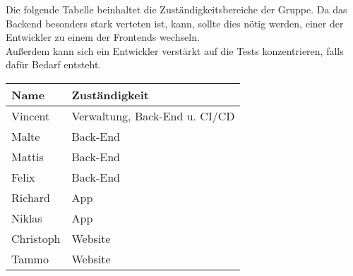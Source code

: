 Die folgende Tabelle beinhaltet die Zuständigkeitsbereiche der Gruppe.
Da das Backend besonders stark verteten ist, kann, sollte dies nötig werden, einer der Entwickler zu einem der Frontends wechseln. \\
Außerdem kann sich ein Entwickler verstärkt auf die Tests konzentrieren, falls dafür Bedarf entsteht. \\

\begin{tabular}{ll}
 \rowcolor[HTML]{E7E7E7} 
 \textbf{Name} & \textbf{Zuständigkeit} \\ \hline
 Vincent & Verwaltung, Back-End u. CI/CD \\ 
 \rowcolor[HTML]{E7E7E7} 
 Malte & Back-End \\ 
 Mattis & Back-End \\ 
 \rowcolor[HTML]{E7E7E7}
 Felix & Back-End\\ 
 Richard & App\\ 
 \rowcolor[HTML]{E7E7E7}
 Niklas &  App \\ 
 Christoph & Website \\ 
 \rowcolor[HTML]{E7E7E7}
 Tammo & Website \\ 
\end{tabular}

\bigskip
